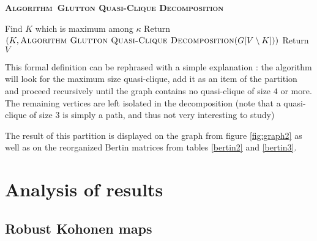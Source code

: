 \documentclass[runningheads,a4paper]{llncs}
\newcommand{\algo}[1]{\textsc{Algorithm~#1}}
\begin{document}
\begin{algorithm}[h!]
\textbf{\algo{Glutton Quasi-Clique Decomposition}}
\label{algo:glutton}
\begin{algorithmic}[1]
        \STATE Find $K$ which is maximum among $\kappa$
        \STATE Return $(K,\algo{Glutton Quasi-Clique Decomposition}(G[V\setminus K]))$
    \ELSE
    	\STATE Return $V$
    \ENDIF
\end{algorithmic}
\end{algorithm}

This formal definition can be rephrased with a simple explanation : the algorithm will look for the maximum size quasi-clique, add it as an item of the partition and proceed recursively until the graph contains no quasi-clique of size $4$ or more. The remaining vertices are left isolated in the decomposition (note that a quasi-clique of size $3$ is simply a path, and thus not very interesting to study)

The result of this partition is displayed on the graph from figure \ref{fig:graph2} as well as on the reorganized Bertin matrices from tables \ref{bertin2} and \ref{bertin3}.


\section{Analysis of results}

\subsection{Robust Kohonen maps}


\setlength{\tabcolsep}{1mm}
\setlength{\arrayrulewidth}{1pt}
\end{document}
